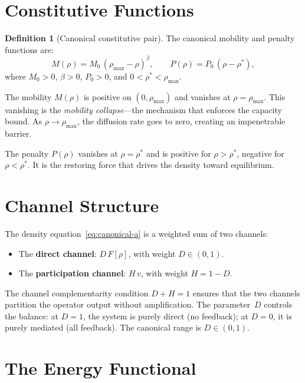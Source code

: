 \documentclass[11pt,twoside,openright]{book}
\theoremstyle{definition}
\newtheorem{definition}{Definition}[chapter]
\theoremstyle{plain}
\theoremstyle{definition}
\theoremstyle{remark}
\newcommand{\rhomax}{\rho_{\max}}
\newcommand{\rhostar}{\rho^{*}}
\newcommand{\Fop}{F[\rho]}
\begin{document}
\section{Constitutive Functions}\label{sec:constitutive}

\begin{definition}[Canonical constitutive pair]\label{def:constitutive}
The canonical mobility and penalty functions are:
\begin{equation}\label{eq:constitutive}
M(\rho) = M_0\,(\rhomax - \rho)^\beta, \qquad P(\rho) = P_0\,(\rho - \rhostar),
\end{equation}
where \(M_0 > 0\), \(\beta > 0\), \(P_0 > 0\), and \(0 < \rhostar < \rhomax\).
\end{definition}

The mobility \(M(\rho)\) is positive on \((0, \rhomax)\) and vanishes at \(\rho = \rhomax\). This vanishing is the \emph{mobility collapse}---the mechanism that enforces the capacity bound. As \(\rho \to \rhomax\), the diffusion rate goes to zero, creating an impenetrable barrier.

The penalty \(P(\rho)\) vanishes at \(\rho = \rhostar\) and is positive for \(\rho > \rhostar\), negative for \(\rho < \rhostar\). It is the restoring force that drives the density toward equilibrium.

\section{Channel Structure}\label{sec:channels}

The density equation~\eqref{eq:canonical-a} is a weighted sum of two channels:
\begin{itemize}
\item The \textbf{direct channel}: \(D\,\Fop\), with weight \(D \in (0,1)\).
\item The \textbf{participation channel}: \(H\,v\), with weight \(H = 1 - D\).
\end{itemize}
The channel complementarity condition \(D + H = 1\) ensures that the two channels partition the operator output without amplification. The parameter~\(D\) controls the balance: at \(D = 1\), the system is purely direct (no feedback); at \(D = 0\), it is purely mediated (all feedback). The canonical range is \(D \in (0,1)\).

\section{The Energy Functional}\label{sec:energy}
\end{document}
